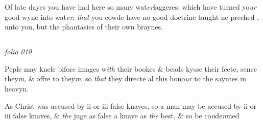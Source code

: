 \documentclass[12pt, a4paper]{book}
\begin{document}
				\marginpar[\vspace{0.5cm}{\textcolor{Gray}{sclaunderous}}]{}
			
				\marginpar[\vspace{0.5cm}{\textcolor{Gray}{n}}]{}
			
		\ifthenelse{\isodd{\thepage}}
		{\reversemarginpar}
		{\normalmarginpar}
		Of late dayes you have had here so many wat\textit{er}laggeres,
 which have turned yo\textit{ur} good wyne into wat\textit{er}, \textit{that} you
 cowde have no good doctrine taught ne preched
			, unto you, but the
 phantasies of their own braynes.
 



\dotfill
					  \subsection*{}  \subsection*{}

\textit{folio 010}

	

				\marginpar[\vspace{0.5cm}{\textcolor{Gray}{Images}}]{}
			
				\marginpar[\vspace{0.5cm}{\textcolor{Gray}{n}}]{}
			
		\ifthenelse{\isodd{\thepage}}
		{\reversemarginpar}
		{\normalmarginpar}
		 Peple may knele bifore images w\textit{ith} their bookes \& beads
 kysse their feete, sence they\textit{m}, \& offre to they\textit{m}, so \textit{that}
 they directe al this hono\textit{ur} to the sayntes in heavyn.
	
				\marginpar[\vspace{0.5cm}{\textcolor{Gray}{seditious}}]{}
			
				\marginpar[\vspace{0.5cm}{\textcolor{Gray}{n}}]{}
			
		\ifthenelse{\isodd{\thepage}}
		{\reversemarginpar}
		{\normalmarginpar}
		 As Christ was accused by ii or iii false knaves,
 so a man may be accused by ii or iii false knaves,
 \& \textit{the} juge as false a knave as \textit{the} best, \& so be co\textit{n}de\textit{m}ned
 
\end{document}
